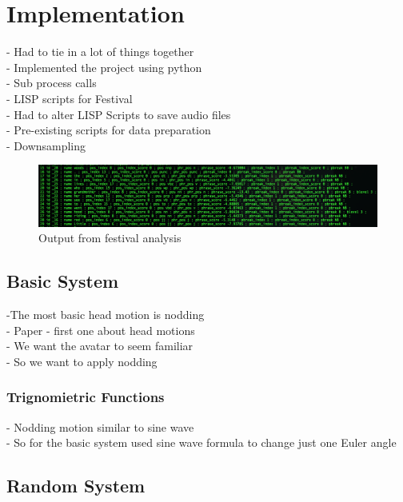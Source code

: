 \documentclass[bsc,frontabs,twoside,singlespacing,parskip]{infthesis}
\begin{document}
\chapter{Implementation}

- Had to tie in a lot of things together \\
- Implemented the project using python \\
- Sub process calls \\
- LISP scripts for Festival \\
- Had to alter LISP Scripts to save audio files \\
- Pre-existing scripts for data preparation \\
- Downsampling

\begin{figure}
	\includegraphics[width=1.1\textwidth]{festival_output.png}
	\caption{Output from festival analysis}
\end{figure}



\section{Basic System}
-The most basic head motion is nodding \\
- Paper - first one about head motions \\
- We want the avatar to seem familiar \\
- So we want to apply nodding \\

\subsection{Trignomietric Functions}
- Nodding motion similar to sine wave \\
- So for the basic system used sine wave formula to change just one Euler angle \\

\section{Random System}
\end{document}
